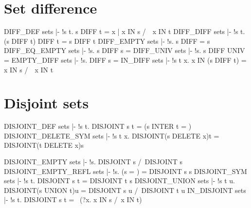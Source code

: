 \section{Set difference}
\THEOREM DIFF\_DEF sets
|- !s t. s DIFF t = {x | x IN s /\ ~x IN t}
\ENDTHEOREM
\THEOREM DIFF\_DIFF sets
|- !s t. (s DIFF t) DIFF t = s DIFF t
\ENDTHEOREM
\THEOREM DIFF\_EMPTY sets
|- !s. s DIFF {} = s
\ENDTHEOREM
\THEOREM DIFF\_EQ\_EMPTY sets
|- !s. s DIFF s = {}
\ENDTHEOREM
\THEOREM DIFF\_UNIV sets
|- !s. s DIFF UNIV = {}
\ENDTHEOREM
\THEOREM EMPTY\_DIFF sets
|- !s. {} DIFF s = {}
\ENDTHEOREM
\THEOREM IN\_DIFF sets
|- !s t x. x IN (s DIFF t) = x IN s /\ ~x IN t
\ENDTHEOREM
\section{Disjoint sets}
\THEOREM DISJOINT\_DEF sets
|- !s t. DISJOINT s t = (s INTER t = {})
\ENDTHEOREM
\THEOREM DISJOINT\_DELETE\_SYM sets
|- !s t x. DISJOINT(s DELETE x)t = DISJOINT(t DELETE x)s
\ENDTHEOREM

\THEOREM DISJOINT\_EMPTY sets
|- !s. DISJOINT {} s /\ DISJOINT s {}
\ENDTHEOREM
\THEOREM DISJOINT\_EMPTY\_REFL sets
|- !s. (s = {}) = DISJOINT s s
\ENDTHEOREM
\THEOREM DISJOINT\_SYM sets
|- !s t. DISJOINT s t = DISJOINT t s
\ENDTHEOREM
\THEOREM DISJOINT\_UNION sets
|- !s t u. DISJOINT(s UNION t)u = DISJOINT s u /\ DISJOINT t u
\ENDTHEOREM
\THEOREM IN\_DISJOINT sets
|- !s t. DISJOINT s t = ~(?x. x IN s /\ x IN t)
\ENDTHEOREM
